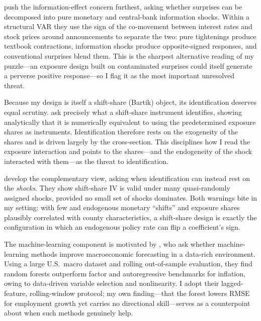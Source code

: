 \documentclass[11pt]{article}
\begin{document}
\citet{jarocinski2020} push the information-effect concern furthest, asking whether surprises can
be decomposed into pure monetary and central-bank information shocks. Within a structural VAR they
use the sign of the co-movement between interest rates and stock prices around announcements to
separate the two: pure tightenings produce textbook contractions, information shocks produce
opposite-signed responses, and conventional surprises blend them. This is the sharpest alternative
reading of my puzzle---an exposure design built on contaminated surprises could itself generate a
perverse positive response---so I flag it as the most important unresolved threat.

Because my design is itself a shift-share (Bartik) object, its identification deserves equal
scrutiny. \citet{gpss2020} ask precisely what a shift-share instrument identifies, showing
analytically that it is numerically equivalent to using the predetermined exposure shares as
instruments. Identification therefore rests on the exogeneity of the shares and is driven largely
by the cross-section. This disciplines how I read the exposure interaction and points to the
shares---and the endogeneity of the shock interacted with them---as the threat to identification.

\citet{borusyak2022} develop the complementary view, asking when identification can instead rest
on the \emph{shocks}. They show shift-share IV is valid under many quasi-randomly assigned shocks,
provided no small set of shocks dominates. Both warnings bite in my setting: with few and
endogenous monetary ``shifts'' and exposure shares plausibly correlated with county
characteristics, a shift-share design is exactly the configuration in which an endogenous policy
rate can flip a coefficient's sign.

The machine-learning component is motivated by \citet{medeiros2021}, who ask whether
machine-learning methods improve macroeconomic forecasting in a data-rich environment. Using a
large U.S.\ macro dataset and rolling out-of-sample evaluation, they find random forests outperform
factor and autoregressive benchmarks for inflation, owing to data-driven variable selection and
nonlinearity. I adopt their lagged-feature, rolling-window protocol; my own finding---that the
forest lowers RMSE for employment growth yet carries no directional skill---serves as a
counterpoint about when such methods genuinely help.
\end{document}
